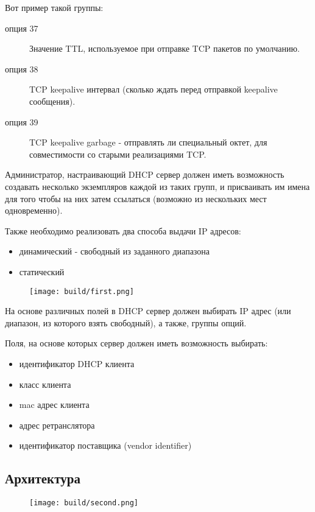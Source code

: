 \documentclass[12pt]{article}
\begin{document}
Вот пример такой группы:
\begin{description}
    \item[опция 37] Значение TTL, используемое при отправке TCP пакетов по умолчанию.
    \item[опция 38] TCP keepalive интервал (сколько ждать перед отправкой keepalive сообщения).
    \item[опция 39] TCP keepalive garbage - отправлять ли специальный октет, для совместимости со старыми реализациями TCP.
\end{description}

Администратор, настраивающий DHCP сервер должен иметь возможность создавать несколько экземпляров каждой из таких групп, и присваивать им имена для того чтобы на них затем ссылаться (возможно из нескольких мест одновременно).

Также необходимо реализовать два способа выдачи IP адресов:
\begin{itemize}
    \item динамический - свободный из заданного диапазона
    \item статический
\end{itemize}

\begin{figure}[H]
    \texttt{[image: build/first.png]}
    \caption{}
\end{figure}

На основе различных полей в DHCP сервер должен выбирать IP адрес (или диапазон, из которого взять свободный), а также, группы опций.

Поля, на основе которых сервер должен иметь возможность выбирать:
\begin{itemize}
    \item идентификатор DHCP клиента
    \item класс клиента
    \item mac адрес клиента
    \item адрес ретранслятора
    \item идентификатор поставщика (vendor identifier)
\end{itemize}

\subsection{Архитектура}

\begin{figure}[H]
    \texttt{[image: build/second.png]}
    \caption{}
\end{figure}
\end{document}
